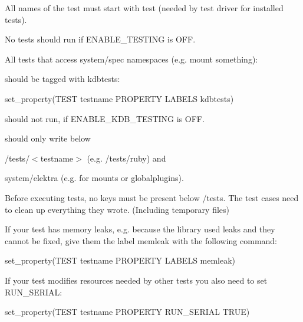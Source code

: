 \begin{DoxyItemize}
\item All names of the test must start with test (needed by test driver for installed tests).
\item No tests should run if E\+N\+A\+B\+L\+E\+\_\+\+T\+E\+S\+T\+I\+NG is O\+FF.
\item All tests that access system/spec namespaces (e.\+g. mount something)\+:
\item should be tagged with {\ttfamily kdbtests}\+:
\end{DoxyItemize}


\begin{DoxyCode}
set\_property(TEST testname PROPERTY LABELS kdbtests)
\end{DoxyCode}



\begin{DoxyItemize}
\item should not run, if {\ttfamily E\+N\+A\+B\+L\+E\+\_\+\+K\+D\+B\+\_\+\+T\+E\+S\+T\+I\+NG} is O\+FF.
\item should only write below
\begin{DoxyItemize}
\item {\ttfamily /tests/$<$testname$>$} (e.\+g. {\ttfamily /tests/ruby}) and
\item {\ttfamily system/elektra} (e.\+g. for mounts or globalplugins).
\end{DoxyItemize}
\item Before executing tests, no keys must be present below {\ttfamily /tests}. The test cases need to clean up everything they wrote. (Including temporary files)
\item If your test has memory leaks, e.\+g. because the library used leaks and they cannot be fixed, give them the label {\ttfamily memleak} with the following command\+:
\end{DoxyItemize}


\begin{DoxyCode}
set\_property(TEST testname PROPERTY LABELS memleak)
\end{DoxyCode}



\begin{DoxyItemize}
\item If your test modifies resources needed by other tests you also need to set {\ttfamily R\+U\+N\+\_\+\+S\+E\+R\+I\+AL}\+:
\end{DoxyItemize}


\begin{DoxyCode}
set\_property(TEST testname PROPERTY RUN\_SERIAL TRUE)
\end{DoxyCode}


